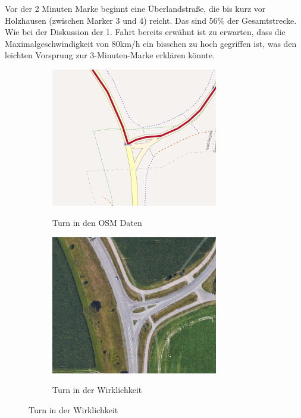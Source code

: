 Vor der 2 Minuten Marke beginnt eine Überlandstraße, die bis kurz vor Holzhausen (zwischen Marker 3 und 4) reicht. Das sind 56$\%$ der Gesamtstrecke. Wie bei der Diskussion der 1. Fahrt bereits erwähnt ist zu erwarten, dass die Maximalgeschwindigkeit von 80km/h ein bisschen zu hoch gegriffen ist, was den leichten Vorsprung zur 3-Minuten-Marke erklären könnte.

\begin{figure}[h]
\centering
\caption{Fahrt 3 -- Vergleich eines Turns}
\label{fig:turn}
\begin{subfigure}{0.49\textwidth}
\centering
\includegraphics[width = 0.80\textwidth]{../media/Fahrt3_Turn.png} \\
\caption{Turn in den OSM Daten}
\label{fig:turnosm}
\end{subfigure}
\begin{subfigure}{0.49\textwidth}
\centering
\includegraphics[width = 0.80\textwidth]{../media/Fahrt3_actualturn.png} \\
\caption{Turn in der Wirklichkeit}
\label{fig:turnworld}
\end{subfigure}
\end{figure}

